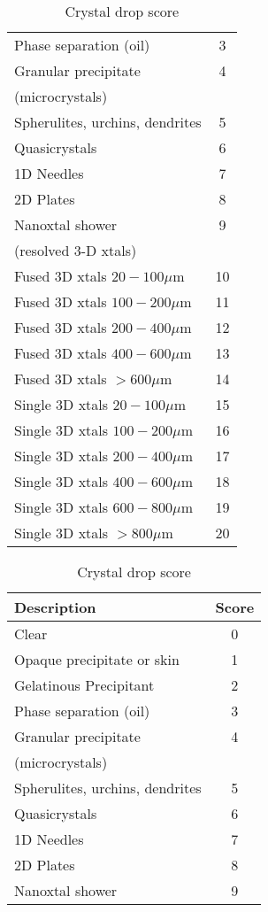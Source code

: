 \documentclass{report}
\begin{document}
\begin{table}[!htb]
\begin{minipage}{.5\linewidth}
\begin{tabular}{l c}
	Phase separation (oil) & 3  \\ 
	Granular precipitate & 4 \\
    (microcrystals) &   \\ 
	Spherulites, urchins, dendrites & 5  \\ 
    Quasicrystals & 6 \\
	1D Needles & 7  \\ 
	2D Plates & 8  \\ 
	Nanoxtal shower & 9 \\
    (resolved 3-D xtals) &   \\ 
	Fused 3D xtals $20 - 100 \mu$m & 10  \\
	Fused 3D xtals $100 - 200 \mu$m & 11  \\ 
	Fused 3D xtals $200 - 400 \mu$m & 12  \\
	Fused 3D xtals $400 - 600 \mu$m & 13  \\
	Fused 3D xtals $> 600 \mu$m & 14  \\
    Single 3D xtals $20 - 100 \mu$m & 15  \\
	Single 3D xtals $100 - 200 \mu$m & 16  \\
	Single 3D xtals $200 - 400 \mu$m & 17 \\
	Single 3D xtals $400 - 600\mu$m & 18 \\
	Single 3D xtals $600 - 800 \mu$m & 19  \\
    Single 3D xtals $> 800 \mu$m & 20  \\
	\bottomrule
\end{tabular} 
	\end{minipage}%
	\begin{minipage}{.5\linewidth}
		\caption*{Crystal drop score}
		\centering
\begin{tabular}{l c}
	\toprule
	Description	& Score	 \\ 
	\midrule
	Clear & 0  \\ 
	Opaque precipitate or skin & 1  \\ 
	Gelatinous Precipitant & 2  \\ 
	Phase separation (oil) & 3  \\ 
	Granular precipitate & 4 \\
    (microcrystals) &   \\ 
	Spherulites, urchins, dendrites & 5  \\ 
    Quasicrystals & 6 \\
	1D Needles & 7  \\ 
	2D Plates & 8  \\ 
	Nanoxtal shower & 9 \\

\end{tabular}
\end{minipage}
\end{table}
\end{document}

